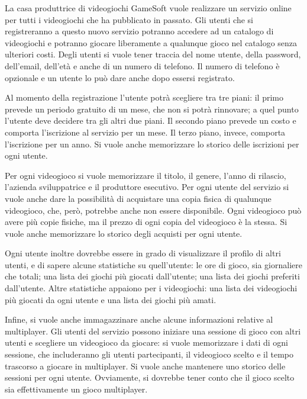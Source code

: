 \documentclass[a4paper,12pt]{report}
\begin{document}
\begin{addmargin}[4em]{4em}
La casa produttrice di videogiochi GameSoft vuole realizzare un servizio online per tutti i videogiochi che ha pubblicato in passato. Gli utenti che si registreranno a questo nuovo servizio potranno accedere ad un catalogo di videogiochi e potranno giocare liberamente a qualunque gioco nel catalogo senza ulteriori costi. Degli utenti si vuole tener traccia del nome utente, della password, dell'email, dell'età e anche di un numero di telefono. Il numero di telefono è opzionale e un utente lo può dare anche dopo essersi registrato.

Al momento della registrazione l'utente potrà scegliere tra tre piani: il primo prevede un periodo gratuito di un mese, che non si potrà rinnovare; a quel punto l'utente deve decidere tra gli altri due piani. Il secondo piano prevede un costo e comporta l'iscrizione al servizio per un mese. Il terzo piano, invece, comporta l'iscrizione per un anno. Si vuole anche memorizzare lo storico delle iscrizioni per ogni utente.

Per ogni videogioco si vuole memorizzare il titolo, il genere, l'anno di rilascio, l'azienda sviluppatrice e il produttore esecutivo. Per ogni utente del servizio si vuole anche dare la possibilità di acquistare una copia fisica di qualunque videogioco, che, però, potrebbe anche non essere disponibile. Ogni videogioco può avere più copie fisiche, ma il prezzo di ogni copia del videogioco è la stessa. Si vuole anche memorizzare lo storico degli acquisti per ogni utente.

Ogni utente inoltre dovrebbe essere in grado di visualizzare il profilo di altri utenti, e di sapere alcune statistiche su quell'utente: le ore di gioco, sia giornaliere che totali; una lista dei giochi più giocati dall'utente; una lista dei giochi preferiti dall'utente. Altre statistiche appaiono per i videogiochi: una lista dei videogiochi più giocati da ogni utente e una lista dei giochi più amati.

Infine, si vuole anche immagazzinare anche alcune informazioni relative al multiplayer. Gli utenti del servizio possono iniziare una sessione di gioco con altri utenti e scegliere un videogioco da giocare: si vuole memorizzare i dati di ogni sessione, che includeranno gli utenti partecipanti, il videogioco scelto e il tempo trascorso a giocare in multiplayer. Si vuole anche mantenere uno storico delle sessioni per ogni utente. Ovviamente, si dovrebbe tener conto che il gioco scelto sia effettivamente un gioco multiplayer. \\\\

\end{addmargin}
\end{document}
